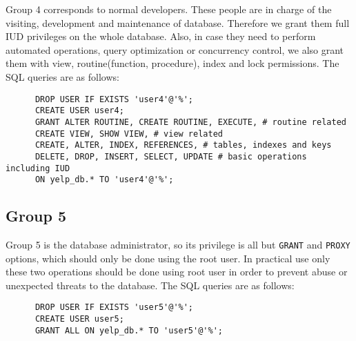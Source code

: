 \documentclass[12pt]{scrbook}
\begin{document}
    Group 4 corresponds to normal developers. These people are in charge of the visiting, development
	and maintenance of database. Therefore we grant them full IUD privileges on the whole database.
	Also, in case they need to perform automated operations, query optimization or concurrency control,
	we also grant them with view, routine(function, procedure), index and lock permissions. The SQL
	queries are as follows:

    \begin{verbatim}
      DROP USER IF EXISTS 'user4'@'%';
      CREATE USER user4;
      GRANT ALTER ROUTINE, CREATE ROUTINE, EXECUTE, # routine related
      CREATE VIEW, SHOW VIEW, # view related
      CREATE, ALTER, INDEX, REFERENCES, # tables, indexes and keys
      DELETE, DROP, INSERT, SELECT, UPDATE # basic operations including IUD
      ON yelp_db.* TO 'user4'@'%';
    \end{verbatim}

\subsection{Group 5}
    
    Group 5 is the database administrator, so its privilege is all but \texttt{GRANT} and
	\texttt{PROXY} options, which should only be done using the root user.
	In practical use only these two operations should be done using root user in order
	to prevent abuse or unexpected threats to the database. The SQL queries are as follows:

    \begin{verbatim}
      DROP USER IF EXISTS 'user5'@'%';
      CREATE USER user5;
      GRANT ALL ON yelp_db.* TO 'user5'@'%';
    \end{verbatim}

\end{document}
